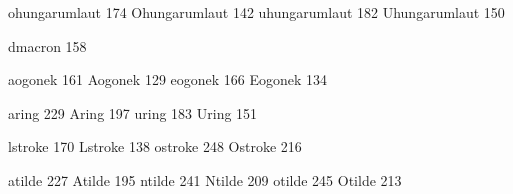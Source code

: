  ohungarumlaut   174
 Ohungarumlaut   142
 uhungarumlaut   182
 Uhungarumlaut   150

 dmacron         158

 aogonek         161
 Aogonek         129
 eogonek         166
 Eogonek         134

 aring           229
 Aring           197
 uring           183
 Uring           151

 lstroke         170
 Lstroke         138
 ostroke         248
 Ostroke         216

 atilde          227
 Atilde          195
 ntilde          241
 Ntilde          209
 otilde          245
 Otilde          213

\stopencoding

\endinput
